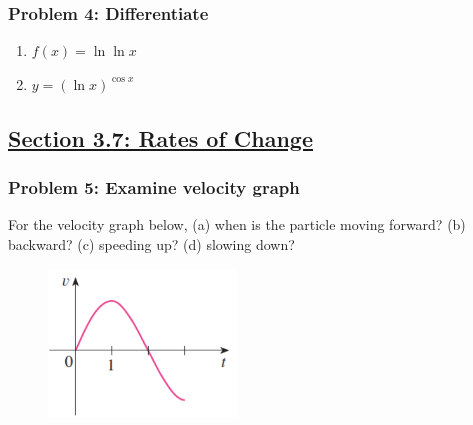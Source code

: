 \documentclass[10pt]{book}
\theoremstyle{definition}
\begin{document}
\subsubsection*{Problem 4: Differentiate}
\begin{enumerate}[label=(\alph*)]
    \item $f(x)=\ln \ln x$\vspace{2cm}
    \item $y=(\ln x)^{\cos x}$\vspace{2cm}
\end{enumerate}
\subsection*{\underline{Section 3.7: Rates of Change}}
\subsubsection*{Problem 5: Examine velocity graph}
For the velocity graph below, (a) when is the particle moving forward? (b) backward? (c) speeding up? (d) slowing down?
\begin{figure}[h!]
    \includegraphics[width=5cm]{vplot1.png}
\end{figure}
\end{document}
